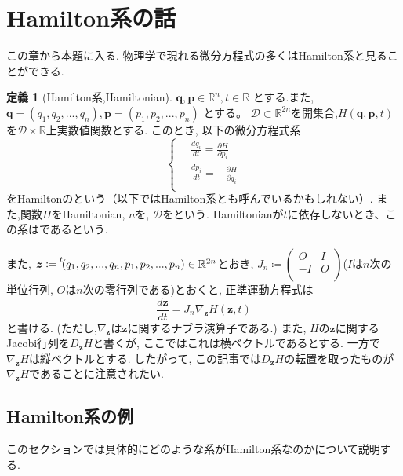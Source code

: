 \documentclass{ltjsarticle}
\theoremstyle{definition}
\numberwithin{thm}{section}
\theoremstyle{definition}
\numberwithin{prop}{section}
\theoremstyle{definition}
\newtheorem{dfn}{定義}
\numberwithin{dfn}{section}
\numberwithin{equation}{section}
\begin{document}
\section{Hamilton系の話}
この章から本題に入る. 物理学で現れる微分方程式の多くはHamilton系と見ることができる.
\begin{dfn}[Hamilton系,Hamiltonian]
    $\bm{q},\bm{p} \in \mathbb{R}^{n}, t\in \mathbb{R}$ とする.また, $\bm{q} = (q_1, q_2, ... ,q_n), \bm{p}=(p_1,p_2, ... ,p_n)$ 
とする。 $\mathcal{D}\subset{\mathbb{R}}^{2n}$を開集合,$H(\bm{q},\bm{p},t)$を$\mathcal{D}\times\mathbb{R}$上実数値関数とする. このとき, 以下の微分方程式系
\begin{equation}
\left\{ \,
    \begin{aligned}
    &\frac{dq_i}{dt} = \frac{\partial H}{\partial p_i} \\
    &\frac{dp_i}{dt} = -\frac{\partial H}{\partial q_i} \\
    \end{aligned}
\right.
\end{equation}
をHamiltonのという（以下ではHamilton系とも呼んでいるかもしれない）. また,関数$H$をHamiltonian, $n$を,  $\mathcal{D}$をという. Hamiltonianが$t$に依存しないとき、この系はであるという.
\end{dfn}

また, $\bm{z}\coloneq \prescript{t\!}{}{(q_1,q_2,...,q_n,p_1,p_2,...,p_n)}\in \mathbb{R}^{2n}$とおき, $J_n\coloneq \begin{pmatrix}
    O&I\\
    -I&O\\
\end{pmatrix}$($I$は$n$次の単位行列, $O$は$n$次の零行列である)とおくと, 正準運動方程式は
\begin{equation}
    \frac{d\bm{z}}{dt}=J_n{\nabla}_{\bm{z}} H(\bm{z},t)
\end{equation}
と書ける. (ただし,${\nabla}_{\bm{z}}$は$\bm{z}$に関するナブラ演算子である.) また, $H$の$\bm{z}$に関するJacobi行列を$D_{\bm{z}}H$と書くが,  ここではこれは横ベクトルであるとする. 一方で${\nabla}_{\bm{z}}H$は縦ベクトルとする. したがって, この記事では$D_{\bm{z}}H$の転置を取ったものが${\nabla}_{\bm{z}}H$であることに注意されたい.

\subsection{Hamilton系の例}
このセクションでは具体的にどのような系がHamilton系なのかについて説明する.
\end{document}
